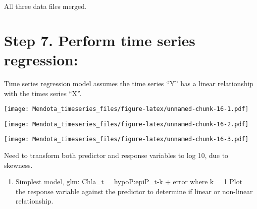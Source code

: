 \documentclass[
]{article}
\newenvironment{Shaded}{\begin{snugshade}}{\end{snugshade}}
\newcommand{\AttributeTok}[1]{\textcolor[rgb]{0.77,0.63,0.00}{#1}}
\newcommand{\CommentTok}[1]{\textcolor[rgb]{0.56,0.35,0.01}{\textit{#1}}}
\newcommand{\DecValTok}[1]{\textcolor[rgb]{0.00,0.00,0.81}{#1}}
\newcommand{\FunctionTok}[1]{\textcolor[rgb]{0.00,0.00,0.00}{#1}}
\newcommand{\NormalTok}[1]{#1}
\newcommand{\SpecialCharTok}[1]{\textcolor[rgb]{0.00,0.00,0.00}{#1}}
\providecommand{\tightlist}{%
  \setlength{\itemsep}{0pt}\setlength{\parskip}{0pt}}
\begin{document}
All three data files merged.

\hypertarget{step-7.-perform-time-series-regression}{%
\section{Step 7. Perform time series
regression:}\label{step-7.-perform-time-series-regression}}

Time series regression model assumes the time series ``Y'' has a linear
relationship with the times series ``X''.

\begin{Shaded}
\end{Shaded}

\texttt{[image: Mendota\_timeseries\_files/figure-latex/unnamed-chunk-16-1.pdf]}

\begin{Shaded}
\end{Shaded}

\texttt{[image: Mendota\_timeseries\_files/figure-latex/unnamed-chunk-16-2.pdf]}

\begin{Shaded}
\end{Shaded}

\texttt{[image: Mendota\_timeseries\_files/figure-latex/unnamed-chunk-16-3.pdf]}

Need to transform both predictor and response variables to log 10, due
to skewness.

\begin{enumerate}
\def\labelenumi{\alph{enumi})}
\tightlist
\item
  Simplest model, glm: Chla\_t = hypoP:epiP\_t-k + error where k = 1
  Plot the response variable against the predictor to determine if
  linear or non-linear relationship.
\end{enumerate}
\end{document}

